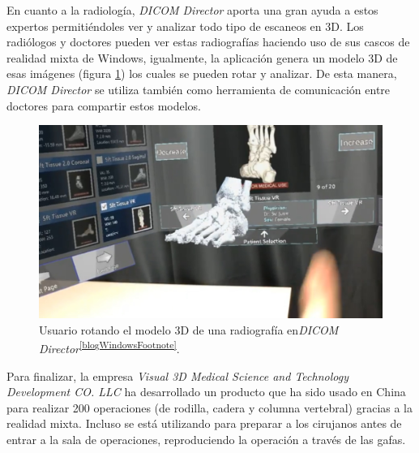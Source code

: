 En cuanto a la radiología, \textit{DICOM Director} aporta una gran ayuda a estos expertos permitiéndoles ver y analizar todo tipo de escaneos en 3D. Los radiólogos y doctores pueden ver estas radiografías haciendo uso de sus cascos de realidad mixta de Windows, igualmente, la aplicación genera un modelo 3D de esas imágenes (figura \ref{fig:dicomDirector}) los cuales se pueden rotar y analizar. De esta manera, \textit{DICOM Director} se utiliza también como herramienta de comunicación entre doctores para compartir estos modelos.

\begin{figure}[h]
    \centering
    \includegraphics[scale=0.25]{Images/Estado del arte/dicomdirector.jpg}
    \caption{Usuario rotando el modelo 3D de una radiografía en\textit{DICOM Director}\textsuperscript{\ref{blogWindowsFootnote}}.}
    \label{fig:dicomDirector}
\end{figure}

Para finalizar, la empresa \textit{Visual 3D Medical Science and Technology Development CO. LLC} ha desarrollado un producto que ha sido usado en China para realizar 200 operaciones (de rodilla, cadera y columna vertebral) gracias a la realidad mixta. Incluso se está utilizando para preparar a los cirujanos antes de entrar a la sala de operaciones, reproduciendo la operación a través de las gafas. 






